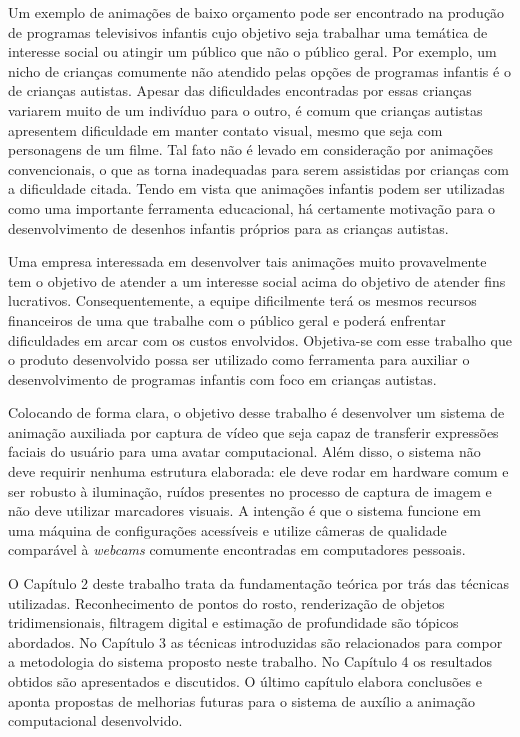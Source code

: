 Um exemplo de animações de baixo orçamento pode ser encontrado na produção de
programas televisivos infantis cujo objetivo seja trabalhar uma temática de
interesse social ou atingir um público que não o público geral. Por exemplo, um
nicho de crianças comumente não atendido pelas opções de programas infantis é o
de crianças autistas. Apesar das dificuldades encontradas por essas crianças
variarem muito de um indivíduo para o outro, é comum que crianças autistas
apresentem dificuldade em manter contato visual, mesmo que seja com personagens
de um filme. Tal fato não é levado em consideração por animações convencionais,
o que as torna inadequadas para serem assistidas por crianças com a dificuldade
citada. Tendo em vista que animações infantis podem ser utilizadas como uma
importante ferramenta educacional, há certamente motivação para o
desenvolvimento de desenhos infantis próprios para as crianças autistas.

Uma empresa interessada em desenvolver tais animações muito provavelmente tem o
objetivo de atender a um interesse social acima do objetivo de atender fins
lucrativos.  Consequentemente, a equipe dificilmente terá os mesmos recursos
financeiros de uma que trabalhe com o público geral e poderá enfrentar
dificuldades em arcar com os custos envolvidos.  Objetiva-se com esse trabalho
que o produto desenvolvido possa ser utilizado como ferramenta para auxiliar o
desenvolvimento de programas infantis com foco em crianças autistas.

Colocando de forma clara, o objetivo desse trabalho é desenvolver um sistema de
animação auxiliada por captura de vídeo que seja capaz de transferir expressões
faciais do usuário para uma avatar computacional. Além disso, o sistema não deve
requirir nenhuma estrutura elaborada: ele deve rodar em hardware comum e ser
robusto à iluminação, ruídos presentes no processo de captura de imagem e não
deve utilizar marcadores visuais.  A intenção é que o sistema funcione em uma
máquina de configurações acessíveis e utilize câmeras de qualidade comparável à
\textit{webcams} comumente encontradas em computadores pessoais.


O Capítulo 2 deste trabalho trata da fundamentação teórica por trás das técnicas
utilizadas. Reconhecimento de pontos do rosto, renderização de objetos
tridimensionais, filtragem digital e estimação de profundidade são tópicos
abordados. No Capítulo 3 as técnicas introduzidas são relacionados para compor a
metodologia do sistema proposto neste trabalho.  No Capítulo 4 os resultados
obtidos são apresentados e discutidos.  O último capítulo elabora conclusões e
aponta propostas de melhorias futuras para o sistema de auxílio a animação
computacional desenvolvido.
